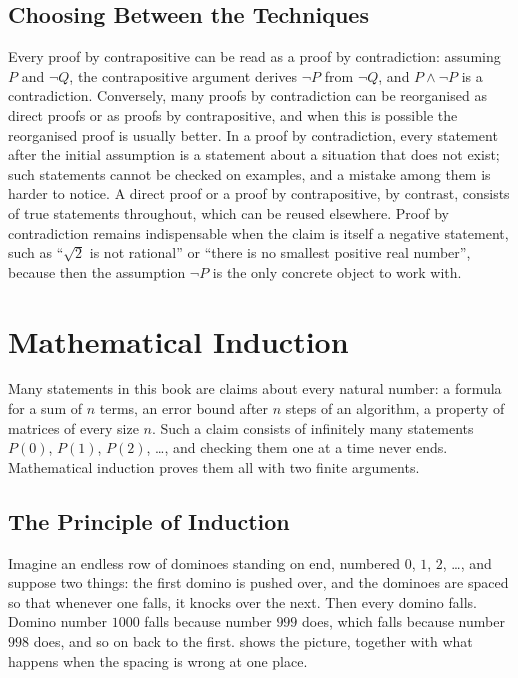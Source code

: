 \subsection{Choosing Between the Techniques}

Every proof by contrapositive can be read as a proof by contradiction: assuming $P$ and $\neg Q$, the contrapositive argument derives $\neg P$ from $\neg Q$, and $P\wedge\neg P$ is a contradiction. Conversely, many proofs by contradiction can be reorganised as direct proofs or as proofs by contrapositive, and when this is possible the reorganised proof is usually better. In a proof by contradiction, every statement after the initial assumption is a statement about a situation that does not exist; such statements cannot be checked on examples, and a mistake among them is harder to notice. A direct proof or a proof by contrapositive, by contrast, consists of true statements throughout, which can be reused elsewhere. Proof by contradiction remains indispensable when the claim is itself a negative statement, such as ``$\sqrt2$ is not rational'' or ``there is no smallest positive real number'', because then the assumption $\neg P$ is the only concrete object to work with.

\section{Mathematical Induction}
\label{sec:induction}

Many statements in this book are claims about every natural number: a formula for a sum of $n$ terms, an error bound after $n$ steps of an algorithm, a property of matrices of every size $n$. Such a claim consists of infinitely many statements $P(0)$, $P(1)$, $P(2)$, \ldots, and checking them one at a time never ends. Mathematical induction proves them all with two finite arguments.

\subsection{The Principle of Induction}

Imagine an endless row of dominoes standing on end, numbered $0$, $1$, $2$, \ldots, and suppose two things: the first domino is pushed over, and the dominoes are spaced so that whenever one falls, it knocks over the next. Then every domino falls. Domino number $1000$ falls because number $999$ does, which falls because number $998$ does, and so on back to the first.  shows the picture, together with what happens when the spacing is wrong at one place.

